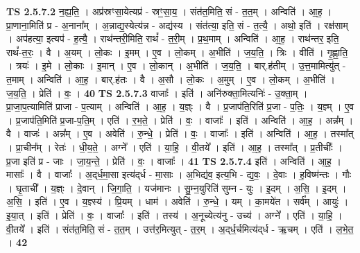 \documentclass[17pt]{extarticle}
\begin{document}
                  \newline
                                \textbf{ TS 2.5.7.2} \newline
                  न॒ह्य॒ति॒ । अप्र॑स्रꣳसा॒येत्यप्र॑ - स्रꣳ॒॒सा॒य॒ । संत॑त॒मिति॒ सं - त॒त॒म् । अन्विति॑ । आ॒ह॒ । प्रा॒णाना॒मिति॑ प्र - अ॒नाना᳚म् । अ॒न्नाद्य॒स्येत्य॑न्न - अद्य॑स्य । संत॑त्या॒ इति॒ सं - त॒त्यै॒ । अथो॒ इति॑ । रक्ष॑साम् । अप॑हत्या॒ इत्यप॑ - ह॒त्यै॒ । राथ॑न्तरी॒मिति॒ राथं᳚ - त॒री॒म् । प्र॒थ॒माम् । अन्विति॑ । आ॒ह॒ । राथ॑न्तर॒ इति॒ राथं᳚-त॒रः॒ । वै । अ॒यम् । लो॒कः । इ॒मम् । ए॒व । लो॒कम् । अ॒भीति॑ । ज॒य॒ति॒ । त्रिः । वीति॑ । गृ॒ह्णा॒ति॒ । त्रयः॑ । इ॒मे । लो॒काः । इ॒मान् । ए॒व । लो॒कान् । अ॒भीति॑ । ज॒य॒ति॒ । बार्.ह॑तीम् । उ॒त्त॒मामित्यु॑त् - त॒माम् । अन्विति॑ । आ॒ह॒ । बार्.ह॑तः । वै । अ॒सौ । लो॒कः । अ॒मुम् । ए॒व । लो॒कम् । अ॒भीति॑ । ज॒य॒ति॒ । प्रेति॑ । वः॒ । \textbf{  40} \newline
                  \newline
                                \textbf{ TS 2.5.7.3} \newline
                  वाजाः᳚ । इति॑ । अनि॑रुक्ता॒मित्यनिः॑ - उ॒क्ता॒म् । प्रा॒जा॒प॒त्यामिति॑ प्राजा - प॒त्याम् । अन्विति॑ । आ॒ह॒ । य॒ज्ञ्ः । वै । प्र॒जाप॑ति॒रिति॑ प्र॒जा - प॒तिः॒ । य॒ज्ञ्म् । ए॒व । प्र॒जाप॑ति॒मिति॑ प्र॒जा-प॒ति॒म् । एति॑ । र॒भ॒ते॒ । प्रेति॑ । वः॒ । वाजाः᳚ । इति॑ । अन्विति॑ । आ॒ह॒ । अन्न᳚म् । वै । वाजः॑ । अन्न᳚म् । ए॒व । अवेति॑ । रु॒न्धे॒ । प्रेति॑ । वः॒ । वाजाः᳚ । इति॑ । अन्विति॑ । आ॒ह॒ । तस्मा᳚त् । प्रा॒चीन᳚म् । रेतः॑ । धी॒य॒ते॒ । अग्ने᳚ । एति॑ । या॒हि॒ । वी॒तये᳚ । इति॑ । आ॒ह॒ । तस्मा᳚त् । प्र॒तीचीः᳚ । प्र॒जा इति॑ प्र - जाः । जा॒य॒न्ते॒ । प्रेति॑ । वः॒ । वाजाः᳚ । \textbf{  41} \newline
                  \newline
                                \textbf{ TS 2.5.7.4} \newline
                  इति॑ । अन्विति॑ । आ॒ह॒ । मासाः᳚ । वै । वाजाः᳚ । अ॒द्‌र्ध॒मा॒सा इत्य॑द्‌र्ध - मा॒साः । अ॒भिद्य॑व॒ इत्य॒भि - द्य॒वः॒ । दे॒वाः । ह॒विष्म॑न्तः । गौः । घृ॒ताची᳚ । य॒ज्ञ्ः । दे॒वान् । जि॒गा॒ति॒ । यज॑मानः । सु॒म्न॒युरिति॑ सुम्न - युः । इ॒दम् । अ॒सि॒ । इ॒दम् । अ॒सि॒ । इति॑ । ए॒व । य॒ज्ञ्स्य॑ । प्रि॒यम् । धाम॑ । अवेति॑ । रु॒न्धे॒ । यम् । का॒मये॑त । सर्व᳚म् । आयुः॑ । इ॒या॒त् । इति॑ । प्रेति॑ । वः॒ । वाजाः᳚ । इति॑ । तस्य॑ । अ॒नूच्येत्य॑नु - उच्य॑ । अग्ने᳚ । एति॑ । या॒हि॒ । वी॒तये᳚ । इति॑ । संत॑त॒मिति॒ सं - त॒त॒म् । उत्त॑र॒मित्युत् - त॒र॒म् । अ॒द्‌र्ध॒र्चमित्य॑द्‌र्ध - ऋ॒चम् । एति॑ । ल॒भे॒त॒ । \textbf{  42} \newline
                  \newline
\end{document}
